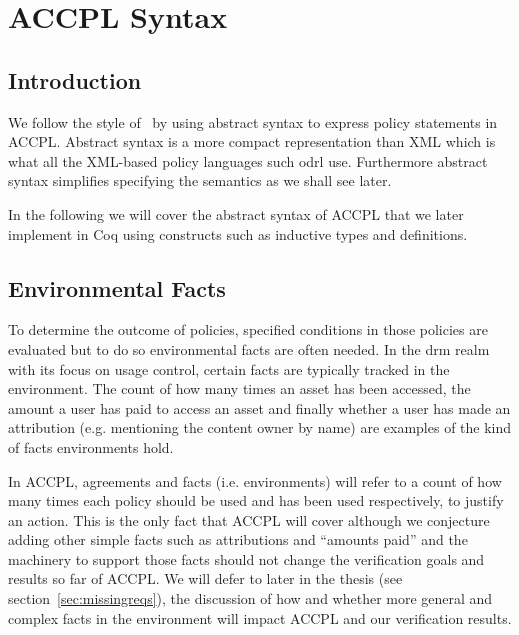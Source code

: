 \chapter{ACCPL Syntax}
\label{chap:odrl0syntax}

\section{Introduction}

We follow the style of~\cite{pucella2006} by using abstract syntax to express policy statements in \ac{ACCPL}. Abstract syntax is a more compact representation than XML which is what all the XML-based policy languages such \ac{odrl} use. Furthermore abstract syntax simplifies specifying the semantics as we shall see later. 

In the following we will cover the abstract syntax of \ac{ACCPL} that we later implement in Coq using constructs such as inductive types and definitions. 

\section{Environmental Facts}\label{sec:odrl0}
To determine the outcome of policies, specified conditions in those policies are evaluated but to do so environmental facts are often needed. In the \ac{drm} realm with its focus on usage control, certain facts are typically tracked in the environment. The count of how many times an asset has been accessed, the amount a user has paid to access an asset and finally whether a user has made an attribution (e.g. mentioning the content owner by name) are examples of the kind of facts environments hold.

In \ac{ACCPL}, agreements and facts (i.e. environments) will refer to a count of how many times each policy should be used and has been used respectively, to justify an action. This is the only fact that \ac{ACCPL} will cover although we conjecture adding other simple facts such as attributions and ``amounts paid'' and the machinery to support those facts should not change the verification goals and results so far of \ac{ACCPL}. We will defer to later in the thesis (see section~\ref{sec:missingreqs}), the discussion of how and whether more general and complex facts in the environment will impact \ac{ACCPL} and our verification results.   

